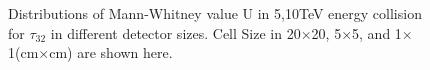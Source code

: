 \documentclass[final,1p,11pt]{elsarticle}
\begin{document}
\begin{figure}
\begin{center}
{   }

\end{center}
\caption{Distributions of Mann-Whitney value U in 5,10TeV energy collision for $\tau_{32}$ in different detector sizes. Cell Size in 20$\times$20, 5$\times$5, and 1$\times$1(cm$\times$cm) are shown here.}
\label{fig:cluster_tau21_tau32}
\end{figure}
\end{document}
